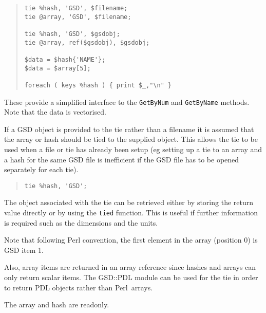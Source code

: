 \documentclass[twoside,11pt]{article}
\newenvironment{myquote}{\begin{quote}\begin{small}}{\end{small}\end{quote}}
\newcommand{\perl}{\xref{\textsf{Perl}}{sun193}{}}
\newcommand{\xref}[3]{#1}
\renewcommand{\_}{\texttt{\symbol{95}}}
\begin{document}
\begin{myquote}
\begin{verbatim}
tie %hash, 'GSD', $filename;
tie @array, 'GSD', $filename;

tie %hash, 'GSD', $gsdobj;
tie @array, ref($gsdobj), $gsdobj;

$data = $hash{'NAME'};
$data = $array[5];

foreach ( keys %hash ) { print $_,"\n" }
\end{verbatim}
\end{myquote}

These provide a simplified interface to the \texttt{GetByNum} and
\texttt{GetByName} methods. Note that the data is vectorised.



If a GSD object is provided to the tie rather than a filename it is
assumed that the array or hash should be tied to the supplied object.
This allows the tie to be used when a file or tie has already been
setup (eg setting up a tie to an array and a hash for the same GSD
file is inefficient if the GSD file has to be opened separately for
each tie).

\begin{myquote}
\begin{verbatim}
tie %hash, 'GSD';
\end{verbatim}
\end{myquote}

The object associated with the tie can be retrieved either
by storing the return value directly or by using the \texttt{tied}
function. This is useful if further information is required such
as the dimensions and the units.

Note that following Perl convention, the first element in the array
(position 0) is GSD item 1.

Also, array items are returned in an array reference since hashes
and arrays can only return scalar items.  The GSD::PDL
module can be used for the tie in order to return PDL objects
rather than \perl\ arrays.


The array and hash are readonly.



\end{document}
